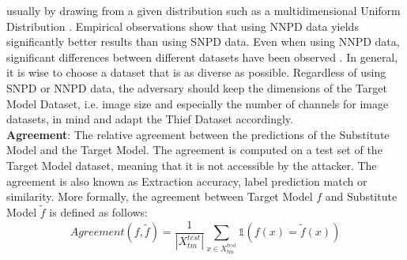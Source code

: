 usually by drawing from a given distribution such as a multidimensional Uniform Distribution \cite{pal2020activethief}. Empirical observations show that using NNPD data
yields significantly better results than using SNPD data. Even when using NNPD data, significant differences between different datasets have been observed 
\cite{pal2020activethief}. In general, it is wise to choose a dataset that is as diverse as possible. Regardless of using SNPD or NNPD data, the adversary should keep the
dimensions of the Target Model Dataset, i.e. image size and especially the number of channels for image datasets, in mind and adapt the Thief Dataset accordingly. \\
\textbf{Agreement}: The relative agreement between the predictions of the Substitute Model and the Target Model. The agreement is computed on a test set of the Target 
Model dataset, meaning that it is not accessible by the attacker. The agreement is also known as Extraction accuracy, label prediction match or similarity. More formally,
the agreement between Target Model $f$ and Substitute Model $\tilde{f}$ is defined as follows:
\begin{equation}
    Agreement(f,\tilde{f}) = \frac{1}{|X_{tm}^{test}|} \sum_{x \in X_{tm}^{test}} \mathds{1}(f(x) = \tilde{f}(x))
\end{equation}




